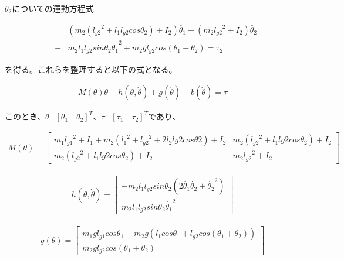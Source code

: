 $\theta_{2}$についての運動方程式

\begin{eqnarray}
  &&(m_{2}({l_{g2}}^2 + l_{1}l_{g2}cos\theta_{2}) + I_{2})\ddot{\theta_{1}} + (m_{2}{l_{g2}}^2 + I_{2})\ddot{\theta_{2}} \nonumber \\
  &+& m_{2}l_{1}l_{g2}sin\theta_{2}{\dot{\theta_{1}}}^2 + m_{2}gl_{g2}cos(\theta_{1} + \theta_{2}) = \tau_{2}
\end{eqnarray}

を得る。これらを整理すると以下の式となる。

\begin{eqnarray}
  M(\theta)\ddot{\theta} + h(\theta, \dot{\theta}) + g(\dot{\theta}) + b(\dot{\theta}) = \tau
\end{eqnarray}

このとき、$\theta$=${[\theta_{1} \quad \theta_{2}]}^T$、$\tau$=${[\tau_{1} \quad \tau_{2}]}^T$であり、

\begin{align}
  M(\theta)= 
            \begin{bmatrix}
              m_{1}{l_{g1}}^2 + I_{1} + m_{2}({l_{1}}^2 + {l_{g2}}^2 + 2l_{2}l{g2}cos\theta{2}) + I_{2} & m_{2}({l_{g2}}^2 + l_{1}l{g2}cos\theta_{2}) + I_{2} \\
              m_{2}({l_{g2}}^2 + l_{1}l{g2}cos\theta_{2}) + I_{2} & m_{2}{l_{g2}}^2 + I_{2}
            \end{bmatrix}
\end{align}

\begin{eqnarray}
  h(\theta, \dot{\theta})=
            \begin{bmatrix}
              -m_{2}l_{1}l_{g2}sin\theta_{2}(2\dot{\theta_{1}}\dot{\theta_{2}} + {\dot{\theta_{2}}}^2) \\
              m_{2}l_{1}l_{g2}sin\theta_{2}{\dot{\theta_{1}}}^2
            \end{bmatrix}
\end{eqnarray}

\begin{eqnarray}
  g(\theta)=
            \begin{bmatrix}
              m_{1}gl_{g1}cos\theta_{1} + m_{2}g(l_{1}cos\theta_{1} + l_{g2}cos(\theta_{1} + \theta_{2})) \\
              m_{2}gl_{g2}cos(\theta_{1} + \theta_{2})
            \end{bmatrix}
\end{eqnarray}

